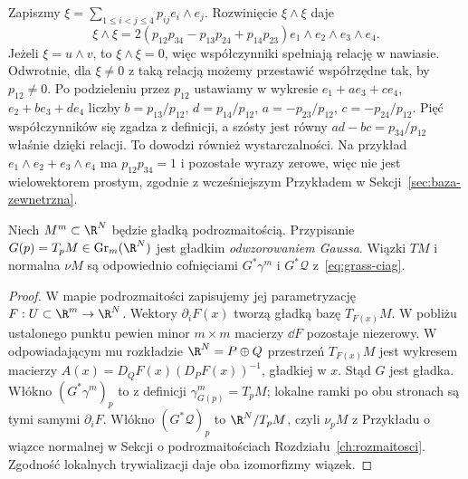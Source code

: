 \begin{przyklad}
Zapiszmy $\xi=\sum_{1\leq i<j\leq4}p_{ij}e_i\wedge e_j$.
Rozwinięcie $\xi\wedge\xi$ daje
\begin{equation}\label{eq:plucker-24}
 \xi\wedge\xi=
 2(p_{12}p_{34}-p_{13}p_{24}+p_{14}p_{23})
   e_1\wedge e_2\wedge e_3\wedge e_4.
\end{equation}
Jeżeli $\xi=u\wedge v$, to $\xi\wedge\xi=0$,
więc współczynniki spełniają relację w nawiasie.
Odwrotnie, dla $\xi\ne0$ z taką relacją możemy
przestawić współrzędne tak, by $p_{12}\ne0$.
Po podzieleniu przez $p_{12}$ ustawiamy w wykresie
$e_1+ae_3+ce_4$, $e_2+be_3+de_4$ liczby
$b=p_{13}/p_{12}$, $d=p_{14}/p_{12}$,
$a=-p_{23}/p_{12}$, $c=-p_{24}/p_{12}$.
Pięć współczynników się zgadza z definicji,
a szósty jest równy $ad-bc=p_{34}/p_{12}$
właśnie dzięki relacji. To dowodzi również
wystarczalności. Na przykład
$e_1\wedge e_2+e_3\wedge e_4$ ma
$p_{12}p_{34}=1$ i pozostałe wyrazy zerowe,
więc nie jest wielowektorem prostym, zgodnie
z wcześniejszym Przykładem w
Sekcji~\ref{sec:baza-zewnetrzna}.
\end{przyklad}

\begin{twierdzenie}
\label{thm:grass-gauss}
Niech $M^m\subset\R^N$ będzie gładką podrozmaitością.
Przypisanie
$G(p)=T_pM\in\operatorname{Gr}_m(\R^N)$
jest gładkim \emph{odwzorowaniem Gaussa}. Wiązki
$TM$ i normalna $\nu M$ są odpowiednio
cofnięciami $G^*\gamma^m$ i $G^*\mathcal Q$
z~\eqref{eq:grass-ciag}.
\end{twierdzenie}
\begin{proof}
W mapie podrozmaitości zapisujemy jej parametryzację
$F:U\subset\R^m\to\R^N$. Wektory
$\partial_iF(x)$ tworzą gładką bazę $T_{F(x)}M$.
W pobliżu ustalonego punktu pewien minor $m\times m$
macierzy $\dd F$ pozostaje niezerowy. W odpowiadającym
mu rozkładzie $\R^N=P\oplus Q$ przestrzeń
$T_{F(x)}M$ jest wykresem macierzy
$A(x)=D_QF(x)(D_PF(x))^{-1}$,
gładkiej w $x$. Stąd $G$ jest gładka.
Włókno $(G^*\gamma^m)_p$ to z definicji
$\gamma^m_{G(p)}=T_pM$; lokalne ramki po obu
stronach są tymi samymi $\partial_iF$.
Włókno $(G^*\mathcal Q)_p$ to
$\R^N/T_pM$, czyli $\nu_pM$ z
Przykładu o wiązce normalnej w Sekcji o podrozmaitościach
Rozdziału~\ref{ch:rozmaitosci}.
Zgodność lokalnych trywializacji daje oba
izomorfizmy wiązek.
\end{proof}

